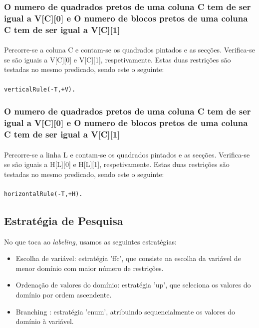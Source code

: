 \documentclass[runningheads,a4paper]{llncs}
\begin{document}
\subsubsection{O numero de quadrados pretos de uma coluna C tem de ser igual a V[C][0] e O numero de blocos pretos de uma coluna C tem de ser igual a V[C][1]}
\paragraph{}
Percorre-se a coluna C e contam-se os quadrados pintados e as secções. Verifica-se se são iguais a V[C][0] e V[C][1], respetivamente.
Estas duas restrições são testadas no mesmo predicado, sendo este o seguinte:
\paragraph{}
\begin{lstlisting}
verticalRule(-T,+V).
\end{lstlisting}

\subsubsection{O numero de quadrados pretos de uma coluna C tem de ser igual a V[C][0] e O numero de blocos pretos de uma coluna C tem de ser igual a V[C][1]}
\paragraph{}
Percorre-se a linha L e contam-se os quadrados pintados e as secções. Verifica-se se são iguais a H[L][0] e H[L][1], respetivamente.
Estas duas restrições são testadas no mesmo predicado, sendo este o seguinte:
\paragraph{}
\begin{lstlisting}
horizontalRule(-T,+H).
\end{lstlisting}

\subsection{Estratégia de Pesquisa}

No que toca ao \textit{labeling}, usamos as seguintes estratégias:

\begin{itemize}
\item Escolha de variável:  estratégia 'ffc', que consiste na escolha da variável de menor domínio com maior número de restrições.
\item Ordenação de valores do domínio: estratégia 'up', que seleciona os valores do domínio por ordem ascendente.
\item Branching : estratégia 'enum', atribuindo sequencialmente os valores do domínio à variável.
\end{itemize}
\end{document}
